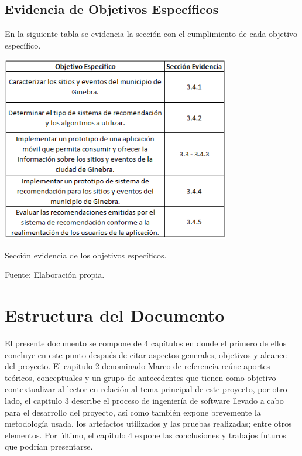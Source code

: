 \documentclass[12pt,letterpaper,openany]{book}
\begin{document}
\subsection{Evidencia de Objetivos Específicos}
En la siguiente tabla se evidencia la sección con el cumplimiento de cada objetivo específico.
\begin{table}[H]
\centering
\includegraphics[width=10cm]{./imagenes/tabla_evidencia}
\caption{Sección evidencia de los objetivos específicos.}
\centering Fuente: Elaboración propia.
\end{table}

\section{Estructura del Documento}
El presente documento se compone de 4 capítulos en donde el primero de ellos concluye en este punto después de citar aspectos generales, objetivos y alcance del proyecto. El capitulo 2 denominado Marco de referencia reúne aportes teóricos, conceptuales y un grupo de antecedentes que tienen como objetivo contextualizar al lector en relación al tema principal de este proyecto, por otro lado, el capitulo 3 describe el proceso de ingeniería de software llevado a cabo para el desarrollo del proyecto, así como también expone brevemente la metodología usada, los artefactos utilizados y las pruebas realizadas; entre otros elementos. Por último, el capitulo 4 expone las conclusiones y trabajos futuros que podrían presentarse.

\end{document}
